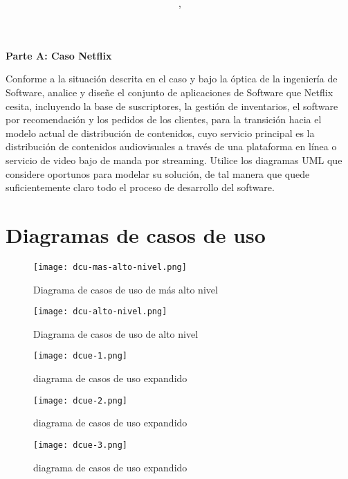 \documentclass{article}
\author{\nombre , \carnet}
\title{\textbf{\Huge\titulo}}
\newcommand*\rbreak{\par\noindent\linebreak}
\begin{document}
\maketitle
\textbf{\huge{Parte A: Caso Netflix}}\rbreak
Conforme a la situación descrita en el caso y bajo
la óptica de la ingeniería de Software, analice y
diseñe el conjunto de aplicaciones de Software
que Netflix cesita, incluyendo la base de 
suscriptores, la gestión de inventarios, el software
por recomendación y los pedidos de los
clientes, para la transición hacia el modelo actual de
distribución de contenidos, cuyo servicio principal
es la distribución de contenidos audiovisuales
a través de una plataforma en línea o 
servicio de video bajo de manda por streaming. Utilice
los diagramas UML que considere oportunos para
modelar su solución, de tal manera que quede 
suficientemente claro todo el proceso de desarrollo
del software.
\section{Diagramas de casos de uso}
\begin{figure}[h]
	\centering
        \texttt{[image: dcu-mas-alto-nivel.png]}
                 \caption{Diagrama de casos de uso de más alto nivel}
\end{figure}	

\begin{figure}[h]
	\centering
        \texttt{[image: dcu-alto-nivel.png]}
                 \caption{Diagrama de casos de uso de alto nivel}
\end{figure}	

\begin{figure}[h]
	\centering
        \texttt{[image: dcue-1.png]}
                 \caption{diagrama de casos de uso expandido}
\end{figure}	

\begin{figure}[h]
	\centering
        \texttt{[image: dcue-2.png]}
                 \caption{diagrama de casos de uso expandido}
\end{figure}	

\begin{figure}[h]
	\centering
        \texttt{[image: dcue-3.png]}
                 \caption{diagrama de casos de uso expandido}
\end{figure}	
\end{document}
